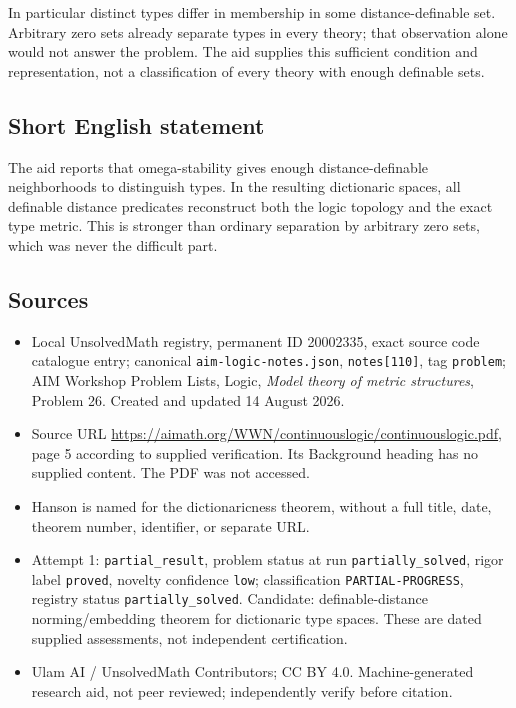 \documentclass[11pt]{article}
\begin{document}
In particular distinct types differ in membership in some distance-definable set. Arbitrary zero sets already separate types in every theory; that observation alone would not answer the problem. The aid supplies this sufficient condition and representation, not a classification of every theory with enough definable sets.
\subsection{Short English statement}
The aid reports that omega-stability gives enough distance-definable neighborhoods to distinguish types. In the resulting dictionaric spaces, all definable distance predicates reconstruct both the logic topology and the exact type metric. This is stronger than ordinary separation by arbitrary zero sets, which was never the difficult part.
\subsection{Sources}
\begin{itemize}
\item Local UnsolvedMath registry, permanent ID 20002335, exact source code catalogue entry; canonical \texttt{aim-logic-notes.json}, \texttt{notes[110]}, tag \texttt{problem}; AIM Workshop Problem Lists, Logic, \emph{Model theory of metric structures}, Problem 26. Created and updated 14 August 2026.
\item Source URL \url{https://aimath.org/WWN/continuouslogic/continuouslogic.pdf}, page 5 according to supplied verification. Its Background heading has no supplied content. The PDF was not accessed.
\item Hanson is named for the dictionaricness theorem, without a full title, date, theorem number, identifier, or separate URL.
\item Attempt 1: \texttt{partial\_result}, problem status at run \texttt{partially\_solved}, rigor label \texttt{proved}, novelty confidence \texttt{low}; classification \texttt{PARTIAL-PROGRESS}, registry status \texttt{partially\_solved}. Candidate: definable-distance norming/embedding theorem for dictionaric type spaces. These are dated supplied assessments, not independent certification.
\item Ulam AI / UnsolvedMath Contributors; CC BY 4.0. Machine-generated research aid, not peer reviewed; independently verify before citation.
\end{itemize}
\end{document}
